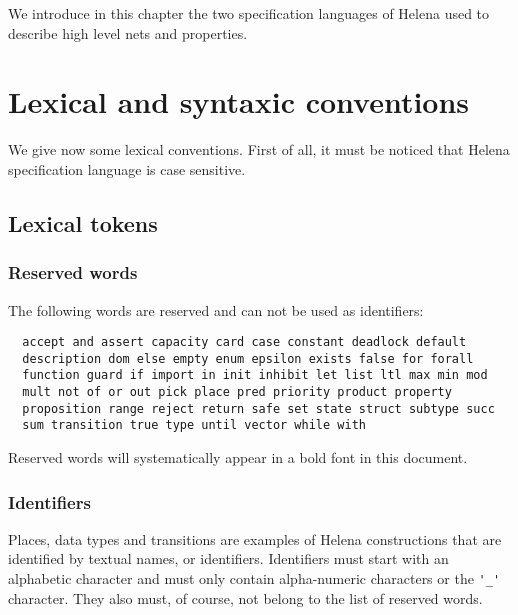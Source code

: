\newcommand\SSsection[3]{\subsubsection{#1}\label{#2}\index{#3}}
\newcommand\LS[1]{\lstinline{#1}}
\newcommand\LSC[1]{\lstinline[language=C]{#1}}

We introduce in this chapter the two specification languages of Helena
used to describe high level nets and properties.

\section{Lexical and syntaxic conventions}

We give now some lexical conventions.  First of all, it must be
noticed that Helena specification language is case sensitive.

\subsection{Lexical tokens}

\subsubsection{Reserved words}
The following words are reserved and can not be used as identifiers:

\begin{lstlisting}
  accept and assert capacity card case constant deadlock default
  description dom else empty enum epsilon exists false for forall
  function guard if import in init inhibit let list ltl max min mod
  mult not of or out pick place pred priority product property
  proposition range reject return safe set state struct subtype succ
  sum transition true type until vector while with
\end{lstlisting}

Reserved words will systematically appear in a bold font in this
document.

\subsubsection{Identifiers}
Places, data types and transitions are examples of Helena
constructions that are identified by textual names, or identifiers.
Identifiers must start with an alphabetic character and must only
contain alpha-numeric characters or the \LS{'_'} character.  They also
must, of course, not belong to the list of reserved words.

